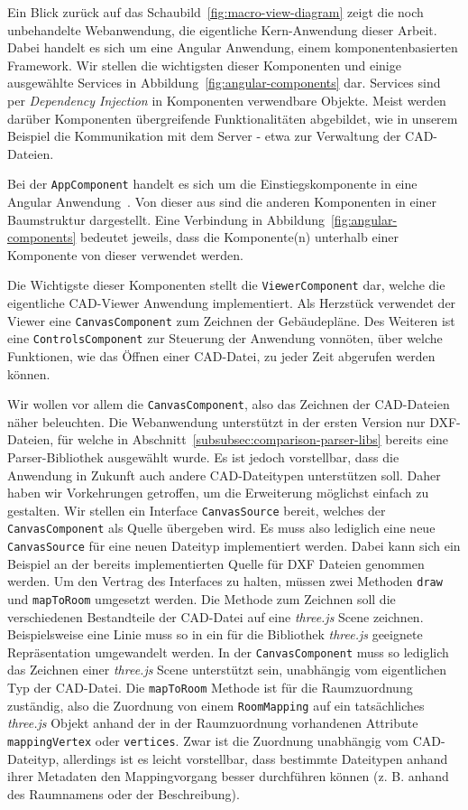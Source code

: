 Ein Blick zurück auf das Schaubild~\ref{fig:macro-view-diagram} zeigt die noch unbehandelte Webanwendung, die eigentliche Kern-Anwendung dieser Arbeit.
Dabei handelt es sich um eine Angular Anwendung, einem komponentenbasierten Framework.
Wir stellen die wichtigsten dieser Komponenten und einige ausgewählte Services in Abbildung~\ref{fig:angular-components} dar.
Services sind per \textit{Dependency Injection} in Komponenten verwendbare Objekte.
Meist werden darüber Komponenten übergreifende Funktionalitäten abgebildet, wie in unserem Beispiel die Kommunikation mit dem Server - etwa zur Verwaltung der CAD-Dateien.

Bei der \texttt{AppComponent} handelt es sich um die Einstiegskomponente in eine Angular Anwendung~\cite{AngularEntryComponent}.
Von dieser aus sind die anderen Komponenten in einer Baumstruktur dargestellt.
Eine Verbindung in Abbildung~\ref{fig:angular-components} bedeutet jeweils, dass die Komponente(n) unterhalb einer Komponente von dieser verwendet werden.

Die Wichtigste dieser Komponenten stellt die \texttt{ViewerComponent} dar, welche die eigentliche CAD-Viewer Anwendung implementiert.
Als Herzstück verwendet der Viewer eine \texttt{CanvasComponent} zum Zeichnen der Gebäudepläne.
Des Weiteren ist eine \texttt{ControlsComponent} zur Steuerung der Anwendung vonnöten, über welche Funktionen, wie das Öffnen einer CAD-Datei, zu jeder Zeit abgerufen werden können.

Wir wollen vor allem die \texttt{CanvasComponent}, also das Zeichnen der CAD-Dateien näher beleuchten.
Die Webanwendung unterstützt in der ersten Version nur DXF-Dateien, für welche in Abschnitt~\ref{subsubsec:comparison-parser-libs} bereits eine Parser-Bibliothek ausgewählt wurde.
Es ist jedoch vorstellbar, dass die Anwendung in Zukunft auch andere CAD-Dateitypen unterstützen soll.
Daher haben wir Vorkehrungen getroffen, um die Erweiterung möglichst einfach zu gestalten.
Wir stellen ein Interface \texttt{CanvasSource} bereit, welches der \texttt{CanvasComponent} als Quelle übergeben wird.
Es muss also lediglich eine neue \texttt{CanvasSource} für eine neuen Dateityp implementiert werden.
Dabei kann sich ein Beispiel an der bereits implementierten Quelle für DXF Dateien genommen werden.
Um den Vertrag des Interfaces zu halten, müssen zwei Methoden \texttt{draw} und \texttt{mapToRoom} umgesetzt werden.
Die Methode zum Zeichnen soll die verschiedenen Bestandteile der CAD-Datei auf eine \textit{three.js} Scene zeichnen.
Beispielsweise eine Linie muss so in ein für die Bibliothek \textit{three.js} geeignete Repräsentation umgewandelt werden.
In der \texttt{CanvasComponent} muss so lediglich das Zeichnen einer \textit{three.js} Scene unterstützt sein, unabhängig vom eigentlichen Typ der CAD-Datei.
Die \texttt{mapToRoom} Methode ist für die Raumzuordnung zuständig, also die Zuordnung von einem \texttt{RoomMapping} auf ein tatsächliches \textit{three.js} Objekt anhand der in der Raumzuordnung vorhandenen Attribute \texttt{mappingVertex} oder \texttt{vertices}.
Zwar ist die Zuordnung unabhängig vom CAD-Dateityp, allerdings ist es leicht vorstellbar, dass bestimmte Dateitypen anhand ihrer Metadaten den Mappingvorgang besser durchführen können (z. B. anhand des Raumnamens oder der Beschreibung).

